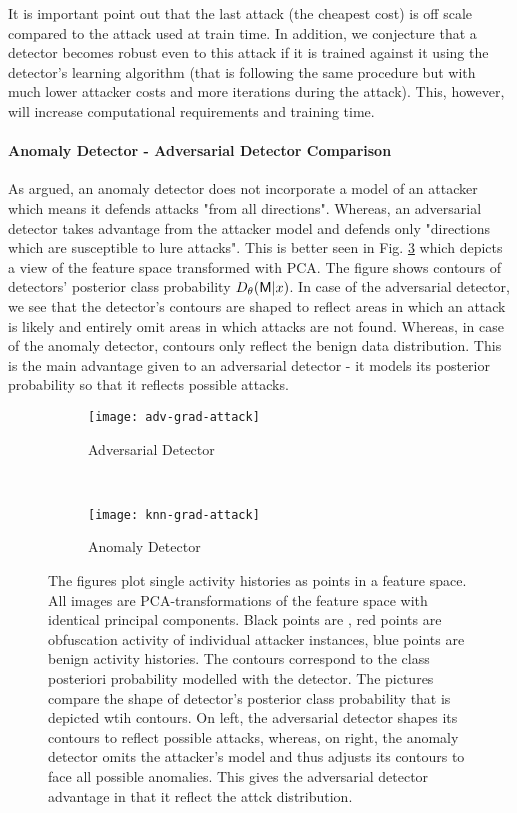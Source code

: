 It is important point out that the last attack (the cheapest cost) is off scale compared to the attack used at train time. In addition, we conjecture that a detector becomes robust even to this attack if it is trained against it using the detector's learning algorithm (that is following the same procedure but with much lower attacker costs and more iterations during the attack). This, however, will increase computational requirements and training time.

\paragraph{Anomaly Detector - Adversarial Detector Comparison}
As argued, an anomaly detector does not incorporate a model of an attacker which means it defends attacks "from all directions". Whereas, an adversarial detector takes advantage from the attacker model and defends only "directions which are susceptible to lure attacks". This is better seen in Fig. \ref{fig:contours-comparison} which depicts a view of the feature space transformed with PCA. The figure shows contours of detectors' posterior class probability $D_\theta(\mathsf{M} | x)$. In case of the adversarial detector, we see that the detector's contours are shaped to reflect areas in which an attack is likely and entirely omit areas in which attacks are not found. Whereas, in case of the anomaly detector, contours only reflect the benign data distribution. This is the main advantage given to an adversarial detector - it models its posterior probability so that it reflects possible attacks.

\begin{figure}[p]
    \centering

        \begin{subfigure}[b]{0.45\textwidth}
            \texttt{[image: adv-grad-attack]}
            \caption{Adversarial Detector}\label{fig:adv_grad_attack}
        \end{subfigure}
        ~
        \begin{subfigure}[b]{0.43\textwidth}
            \texttt{[image: knn-grad-attack]}
            \caption{Anomaly Detector}\label{fig:knn_adv_attack}
        \end{subfigure}

    \caption{The figures plot single activity histories as points in a feature space. All images are PCA-transformations of the feature space with identical principal components. Black points are \NA, red points are obfuscation activity of individual attacker instances, blue points are benign activity histories. The contours correspond to the class posteriori probability modelled with the detector. The pictures compare the shape of detector's posterior class probability that is depicted wtih contours. On left, the adversarial detector shapes its contours to reflect possible attacks, whereas, on right, the anomaly detector omits the attacker's model and thus adjusts its contours to face all possible anomalies. This gives the adversarial detector advantage in that it reflect the attck distribution.}\label{fig:contours-comparison}
\end{figure}
